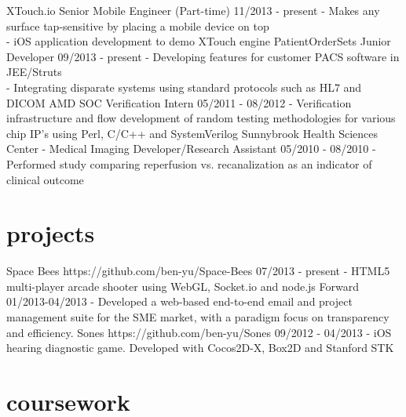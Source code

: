 \documentclass[]{friggeri-cv}
\begin{document}
\begin{entrylist}
  \entry
    {XTouch.io}
    {Senior Mobile Engineer (Part-time)}
    {11/2013 - present}
    {- Makes any surface tap-sensitive by placing a mobile device on top\\
     - iOS application development to demo XTouch engine}
  \entry
    {PatientOrderSets}
    {Junior Developer}
    {09/2013 - present}
    {- Developing features for customer PACS software in JEE/Struts\\
     - Integrating disparate systems using standard protocols such as HL7 and DICOM}
  \entry
    {AMD}
    {SOC Verification Intern}
    {05/2011 - 08/2012}
    {- Verification infrastructure and  flow development of random testing methodologies for various chip   IP’s using Perl, C/C++ and SystemVerilog}
  \entry
    {Sunnybrook Health Sciences Center - Medical Imaging}
    {Developer/Research Assistant}
    {05/2010 - 08/2010}
    {- Performed study comparing reperfusion vs. recanalization as an indicator of clinical outcome}
\end{entrylist}

\section{projects}

\begin{entrylist}
  \entry
    {Space Bees}
    {https://github.com/ben-yu/Space-Bees}
    {07/2013 - present}
    {- HTML5 multi-player arcade shooter using WebGL, Socket.io and node.js}
  \entry
    {Forward}
    {}
    {01/2013-04/2013}
    {- Developed a web-based end-to-end email and project management suite for the SME market, with a paradigm focus on transparency and efficiency.}
  \entry
    {Sones}
    {https://github.com/ben-yu/Sones}
    {09/2012 - 04/2013}
    {- iOS hearing diagnostic game. Developed with Cocos2D-X, Box2D and Stanford STK}
\end{entrylist}

\newpage

\section{coursework}
\end{document}
